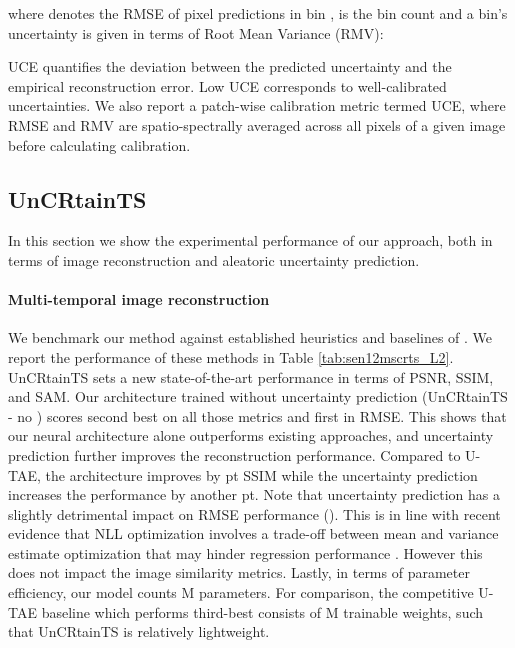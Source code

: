 \documentclass[10pt,twocolumn,letterpaper]{article}
\newcommand{\tabref}[1]{ Table \ref{#1}}
\begin{document}
\label{eq:UCE}

where  denotes the RMSE of  pixel predictions in bin ,  is the bin count and a bin's uncertainty  is given in terms of Root Mean Variance (RMV):

\label{eq:RMV}

UCE quantifies the deviation between the predicted uncertainty and the empirical reconstruction error. Low UCE corresponds to well-calibrated uncertainties. We also report a patch-wise calibration metric termed UCE, where RMSE and RMV are spatio-spectrally averaged across all pixels of a given image before calculating calibration.

\subsection{UnCRtainTS} 
\label{subsection:eval_reconstruct}
In this section we show the experimental performance of our approach, both in terms of image reconstruction and aleatoric uncertainty prediction.




\paragraph{\bf Multi-temporal image reconstruction} We benchmark our method against established  heuristics and baselines of \cite{meraner2020cloud, Sarukkai_Jain_Uzkent_Ermon_2019, ebel2022sen12ms, garnot2021panoptic}.
We report the performance of these methods in \tabref{tab:sen12mscrts_L2}. UnCRtainTS sets a new state-of-the-art performance in terms of PSNR, SSIM, and SAM. Our architecture trained without uncertainty prediction (UnCRtainTS - no ) scores second best on all those metrics and first in RMSE. This shows that our neural architecture alone  outperforms existing approaches, and uncertainty prediction further improves the reconstruction performance. Compared to U-TAE, the architecture improves by pt SSIM while the uncertainty prediction increases the performance by another pt. Note that uncertainty prediction has a slightly detrimental impact on RMSE performance (). This is in line with recent evidence that NLL optimization involves a trade-off between mean and variance estimate optimization that may hinder regression performance \cite{skafte2019reliable, seitzer2021pitfalls}. However this does not impact the image similarity metrics. Lastly, in terms of parameter efficiency, our model counts M parameters. For comparison, the competitive U-TAE baseline \cite{garnot2021panoptic} which performs third-best consists of M trainable weights, such that UnCRtainTS is relatively lightweight.
\end{document}
